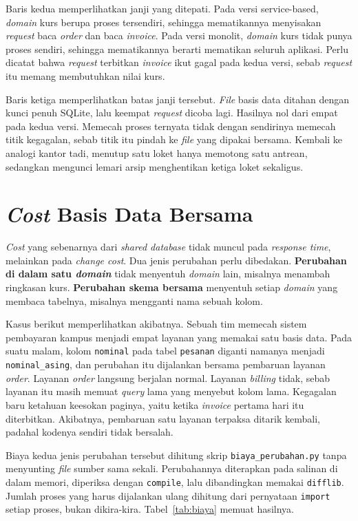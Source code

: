 Baris kedua memperlihatkan janji yang ditepati. Pada versi service-based,
\textit{domain} kurs berupa proses tersendiri, sehingga mematikannya menyisakan
\textit{request} baca \textit{order} dan baca \textit{invoice}. Pada versi monolit, \textit{domain} kurs tidak
punya proses sendiri, sehingga mematikannya berarti mematikan seluruh
aplikasi. Perlu dicatat bahwa \textit{request} terbitkan \textit{invoice} ikut gagal pada
kedua versi, sebab \textit{request} itu memang membutuhkan nilai kurs.

Baris ketiga memperlihatkan batas janji tersebut. \textit{File} basis data ditahan
dengan kunci penuh SQLite, lalu keempat \textit{request} dicoba lagi. Hasilnya nol
dari empat pada kedua versi. Memecah proses ternyata tidak dengan sendirinya
memecah titik kegagalan, sebab titik itu pindah ke \textit{file} yang dipakai
bersama. Kembali ke analogi kantor tadi, menutup satu loket hanya memotong satu
antrean, sedangkan mengunci lemari arsip menghentikan ketiga loket sekaligus.

\section{\textit{Cost} Basis Data Bersama}

\textit{Cost} yang sebenarnya dari \textit{shared database} tidak muncul pada \textit{response time},
melainkan pada \textit{change cost}. Dua jenis perubahan perlu dibedakan.
\textbf{Perubahan di dalam satu \textit{domain}} tidak menyentuh \textit{domain} lain, misalnya
menambah ringkasan kurs. \textbf{Perubahan skema bersama} menyentuh setiap
\textit{domain} yang membaca tabelnya, misalnya mengganti nama sebuah kolom.

Kasus berikut memperlihatkan akibatnya. Sebuah tim memecah sistem pembayaran
kampus menjadi empat layanan yang memakai satu basis data. Pada suatu malam,
kolom \texttt{nominal} pada tabel \texttt{pesanan} diganti namanya menjadi
\texttt{nominal\_asing}, dan perubahan itu dijalankan bersama pembaruan layanan
\textit{order}. Layanan \textit{order} langsung berjalan normal. Layanan \textit{billing} tidak,
sebab layanan itu masih memuat \textit{query} lama yang menyebut kolom lama. Kegagalan
baru ketahuan keesokan paginya, yaitu ketika \textit{invoice} pertama hari itu
diterbitkan. Akibatnya, pembaruan satu layanan terpaksa ditarik kembali,
padahal kodenya sendiri tidak bersalah.

Biaya kedua jenis perubahan tersebut dihitung skrip
\texttt{biaya\_perubahan.py} tanpa menyunting \textit{file} sumber sama sekali.
Perubahannya diterapkan pada salinan di dalam memori, diperiksa dengan
\texttt{compile}, lalu dibandingkan memakai \texttt{difflib}. Jumlah proses yang
harus dijalankan ulang dihitung dari pernyataan \texttt{import} setiap proses,
bukan dikira-kira. Tabel~\ref{tab:biaya} memuat hasilnya.


